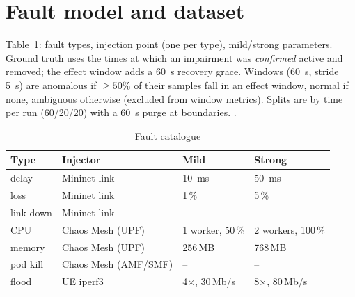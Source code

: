 \section{Fault model and dataset}
Table~\ref{tab:faults}: fault types, injection point (one per type), mild/strong parameters.
Ground truth uses the times at which an impairment was \emph{confirmed} active and removed; the effect
window adds a \SI{60}{s} recovery grace. Windows (\SI{60}{s}, stride \SI{5}{s}) are anomalous if
$\geq 50\%$ of their samples fall in an effect window, normal if none, ambiguous otherwise (excluded
from window metrics). Splits are by time per run (60/20/20) with a \SI{60}{s} purge at boundaries.
.
\begin{table}[t]\centering\caption{Fault catalogue}\label{tab:faults}
\begin{tabular}{llll}\toprule Type & Injector & Mild & Strong\\\midrule
delay & Mininet link & \SI{10}{ms} & \SI{50}{ms}\\
loss & Mininet link & 1\,\% & 5\,\%\\
link down & Mininet link & -- & --\\
CPU & Chaos Mesh (UPF) & 1 worker, 50\,\% & 2 workers, 100\,\%\\
memory & Chaos Mesh (UPF) & 256\,MB & 768\,MB\\
pod kill & Chaos Mesh (AMF/SMF) & -- & --\\
flood & UE iperf3 & 4$\times$, 30\,Mb/s & 8$\times$, 80\,Mb/s\\\bottomrule
\end{tabular}\end{table}
